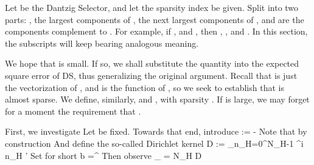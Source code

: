 \startsection [title={Almost-Sparsity of Angular Channel Response}]
\startsubsection [title={Norm of Array Response}]

Let  be the Dantzig Selector, and let the sparsity index  be given.
Split  into two parts: , the largest  components of ,  the next  largest components of , and  are the components complement to .
For example, if , and , then , , and .
In this section, the subscripts  will keep bearing analogous meaning.

We hope that  is small.
If so, we shall substitute the quantity into the expected square error of DS, thus generalizing the original argument.
Recall that  is just the vectorization of , and  is the function of , so we seek to establish that  is almost sparse.
We define, similarly,  and , with sparsity .
If  is large, we may forget for a moment the requirement that .

First, we investigate
%
%
Let \m {\f} be fixed.
Towards that end, introduce
%
 {
\NC \psi {}
:=\NC {}
-\pi \NR
}
%
Note that by construction
%
 {
\NC {}
\leq \NC \pi \NR
}
%
And define the so-called Dirichlet kernel
%
 {
\NC D 
:= \NC \sum_{n_H=0}^{N_H-1} ^{i n_H \psi'} \NR
}
%
Set for short
%
 {
\NC b \SB {\f}
=\NC {}^\Adj {} \SB {\f} \NR
}
%
Then observe
%
 {
\NC {} _{}
=\NC {} {N_H} D  \NR
}

